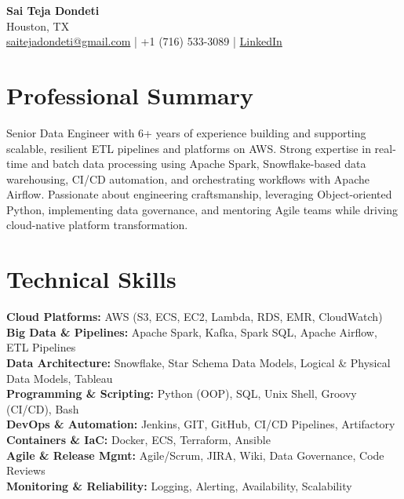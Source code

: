 \documentclass[10pt]{article}
\begin{document}
\begin{center}
    {\LARGE \textbf{Sai Teja Dondeti}} \\
    \vspace{2pt}
    Houston, TX \\
    \href{mailto:saitejadondeti@gmail.com}{saitejadondeti@gmail.com} \;|\;
    +1 (716) 533-3089 \;|\;
    \href{https://www.linkedin.com/in/sai-teja-dondeti/}{LinkedIn}
\end{center}

\section*{Professional Summary}
Senior Data Engineer with 6+ years of experience building and supporting scalable, resilient ETL pipelines and platforms on AWS. Strong expertise in real-time and batch data processing using Apache Spark, Snowflake-based data warehousing, CI/CD automation, and orchestrating workflows with Apache Airflow. Passionate about engineering craftsmanship, leveraging Object-oriented Python, implementing data governance, and mentoring Agile teams while driving cloud-native platform transformation.

\section*{Technical Skills}

\textbf{Cloud Platforms:} AWS (S3, ECS, EC2, Lambda, RDS, EMR, CloudWatch) \\
\textbf{Big Data \& Pipelines:} Apache Spark, Kafka, Spark SQL, Apache Airflow, ETL Pipelines \\
\textbf{Data Architecture:} Snowflake, Star Schema Data Models, Logical \& Physical Data Models, Tableau \\
\textbf{Programming \& Scripting:} Python (OOP), SQL, Unix Shell, Groovy (CI/CD), Bash \\
\textbf{DevOps \& Automation:} Jenkins, GIT, GitHub, CI/CD Pipelines, Artifactory \\
\textbf{Containers \& IaC:} Docker, ECS, Terraform, Ansible \\
\textbf{Agile \& Release Mgmt:} Agile/Scrum, JIRA, Wiki, Data Governance, Code Reviews \\
\textbf{Monitoring \& Reliability:} Logging, Alerting, Availability, Scalability
\end{document}
